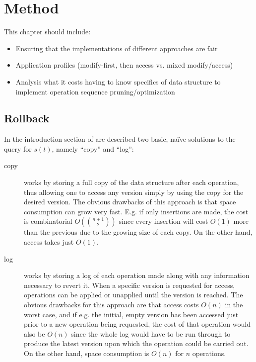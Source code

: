 \chapter{Method}

This chapter should include:
\begin{itemize}
  \item Ensuring that the implementations of different approaches are fair
  \item Application profiles (modify-first, then access vs. mixed modify/access)
  \item Analysis what it costs having to know specifics of data structure to
  implement operation sequence pruning/optimization
\end{itemize}

\section{Rollback}

In the introduction section of \cite{Tsotras1995237} are described two basic,
na\"ive solutions to the query for $s(t)$, namely ``copy'' and ``log'':
\begin{description}
  \item[copy] works by storing a full copy of the data structure after each
  operation, thus allowing one to access any version simply by using the copy
  for the desired version. The obvious drawbacks of this approach is that space
  consumption can grow very fast. E.g. if only insertions are made, the cost is
  combinatorial $O\left(\binom{n+1}{2}\right)$ since every insertion will cost
  $O(1)$ more than the previous due to the growing size of each copy. On the
  other hand, access takes just $O(1)$.
  
  \item[log] works by storing a log of each operation made along with any
  information necessary to revert it. When a specific version is requested for
  access, operations can be applied or unapplied until the version is reached. 
  The obvious drawbacks for this approach are that access costs $O(n)$ in the 
  worst case, and if e.g. the initial, empty version has been accessed just 
  prior to a new operation being requested, the cost of that operation would 
  also be $O(n)$ since the whole log would have to be run through to produce 
  the latest version upon which the operation could be carried out. On the other
  hand, space consumption is $O(n)$ for $n$ operations.
\end{description}

